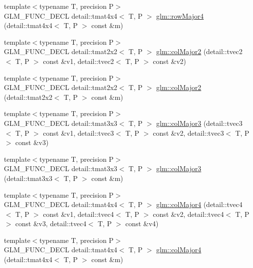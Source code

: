 \begin{CompactItemize}
\item 
{\footnotesize template$<$typename T, precision P$>$ }\\GLM\_\-FUNC\_\-DECL detail::tmat4x4$<$ T, P $>$ \hyperlink{group__gtx__matrix__major__storage_g77df85015848f4812005392d9c78b8a4}{glm::rowMajor4} (detail::tmat4x4$<$ T, P $>$ const \&m)
\item 
{\footnotesize template$<$typename T, precision P$>$ }\\GLM\_\-FUNC\_\-DECL detail::tmat2x2$<$ T, P $>$ \hyperlink{group__gtx__matrix__major__storage_g3e3ecc119e43821d7ac582124ef891cb}{glm::colMajor2} (detail::tvec2$<$ T, P $>$ const \&v1, detail::tvec2$<$ T, P $>$ const \&v2)
\item 
{\footnotesize template$<$typename T, precision P$>$ }\\GLM\_\-FUNC\_\-DECL detail::tmat2x2$<$ T, P $>$ \hyperlink{group__gtx__matrix__major__storage_g095b6bfd85a85c3a0878b86363e3d0aa}{glm::colMajor2} (detail::tmat2x2$<$ T, P $>$ const \&m)
\item 
{\footnotesize template$<$typename T, precision P$>$ }\\GLM\_\-FUNC\_\-DECL detail::tmat3x3$<$ T, P $>$ \hyperlink{group__gtx__matrix__major__storage_gfa499e4dd0fe76587feea1f3ad8dcfef}{glm::colMajor3} (detail::tvec3$<$ T, P $>$ const \&v1, detail::tvec3$<$ T, P $>$ const \&v2, detail::tvec3$<$ T, P $>$ const \&v3)
\item 
{\footnotesize template$<$typename T, precision P$>$ }\\GLM\_\-FUNC\_\-DECL detail::tmat3x3$<$ T, P $>$ \hyperlink{group__gtx__matrix__major__storage_g645e8b3708b02ae2ca1c4f3048f8f32a}{glm::colMajor3} (detail::tmat3x3$<$ T, P $>$ const \&m)
\item 
{\footnotesize template$<$typename T, precision P$>$ }\\GLM\_\-FUNC\_\-DECL detail::tmat4x4$<$ T, P $>$ \hyperlink{group__gtx__matrix__major__storage_g585113d3d54f337093700210a8103f6d}{glm::colMajor4} (detail::tvec4$<$ T, P $>$ const \&v1, detail::tvec4$<$ T, P $>$ const \&v2, detail::tvec4$<$ T, P $>$ const \&v3, detail::tvec4$<$ T, P $>$ const \&v4)
\item 
{\footnotesize template$<$typename T, precision P$>$ }\\GLM\_\-FUNC\_\-DECL detail::tmat4x4$<$ T, P $>$ \hyperlink{group__gtx__matrix__major__storage_g85020709c53f89466c5135114e85d34a}{glm::colMajor4} (detail::tmat4x4$<$ T, P $>$ const \&m)
\end{CompactItemize}


